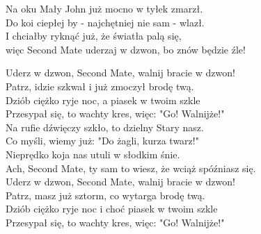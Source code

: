 Na oku Mały John już mocno w tyłek zmarzł. \\
Do koi ciepłej by - najchętniej nie sam - wlazł. \\
I chciałby ryknąć już, że światła palą się, \\
więc Second Mate uderzaj w dzwon, bo znów będzie źle! \\
\newpage

Uderz w dzwon, Second Mate, walnij bracie w dzwon! \\
Patrz, idzie szkwał i już zmoczył brodę twą. \\
Dziób ciężko ryje noc, a piasek w twoim szkle \\
Przesypał się, to wachty kres, więc: "Go! Walnijże!" \\

Na rufie dźwięczy szkło, to dzielny Stary nasz. \\
Co myśli, wiemy już: "Do żagli, kurza twarz!" \\
Nieprędko koja nas utuli w słodkim śnie. \\
Ach, Second Mate, ty sam to wiesz, że wciąż spóźniasz się. \\

Uderz w dzwon, Second Mate, walnij bracie w dzwon! \\
Patrz, masz już sztorm, co wytarga brodę twą. \\
Dziób ciężko ryje noc i choć piasek w twoim szkle \\
Przesypał się, to wachty kres, więc: "Go! Walnijże!" \\